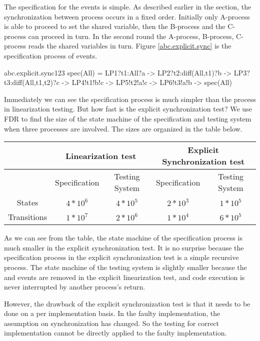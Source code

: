 \documentclass[a4paper, 12pt]{article}
\begin{document}
The specification for the  events is simple. As described earlier in the section, the synchronization between process occurs in a fixed order. Initially only A-process is able to proceed to set the shared variable, then the B-process and the C-process can proceed in turn. In the second round the A-process, B-process, C-process reads the shared variables in turn. Figure \ref{abc.explicit.sync} is the specification process of  events. 

\begin{cspfloat}{abc.explicit.sync}{123}
spec(All) = 
  LP1?t1:All?a ->
  LP2?t2:diff(All,{t1})?b ->
  LP3?t3:diff(All,{t1,t2})?c ->
  LP4!t1!b!c ->
  LP5!t2!a!c ->
  LP6!t3!a!b ->
  spec(All)
\end{cspfloat}

Immediately we can see the specification process is much simpler than the process in linearization testing. But how fast is the explicit synchronization test? We use FDR to find the size of the state machine of the specification and testing system when three processes are involved. The sizes are organized in the table below. 

\begin{adjustbox}{width=\columnwidth,center}
\begin{tabular}{c c c c c}
  \hline
  & \multicolumn{2}{c}{Linearization test} & \multicolumn{2}{c}{Explicit Synchronization test} \\ \hline
  & Specification & Testing System & Specification & Testing System \\ \hline
  States      & $4*10^6$ & $4*10^5$ & $2*10^3$ & $1*10^5$\\ \hline
  Transitions & $1*10^7$ & $2*10^6$ & $1*10^4$ & $6*10^5$\\ \hline
\end{tabular}
\end{adjustbox}
\newline

As we can see from the table, the state machine of the specification process is much smaller in the explicit synchronization test. It is no surprise because the specification process in the explicit synchronization test is a simple recursive process. The state machine of the testing system is slightly smaller because the  and  events are removed in the explicit linearization test, and code execution is never interrupted by another process's return. 

However, the drawback of the explicit synchronization test is that it needs to be done on a per implementation basis. In the faulty implementation, the assumption on synchronization has changed. So the testing for correct implementation cannot be directly applied to the faulty implementation. 
\end{document}
